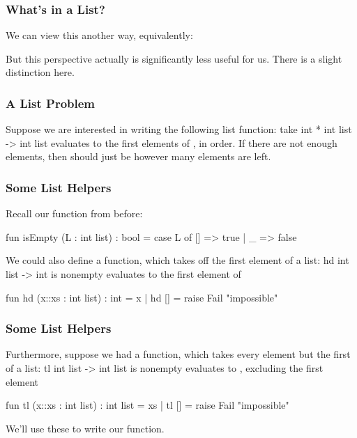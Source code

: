 \documentclass[aspectratio=169]{beamer}
\begin{document}
\begin{frame}[fragile]
  \frametitle{What's in a List?}

  We can view this another way, equivalently: 

  \pause
  \vspace{\fill}


  \pause
  \vspace{\fill}

  But this perspective actually is significantly less useful for
  us. There is a slight distinction here.
\end{frame}

\begin{frame}[fragile]
  \frametitle{A List Problem}

  Suppose we are interested in writing the following list function:
  \spec
    {take}
    {int * int list -> int list}
    {}
    { evaluates to the first  elements of , 
    in order. If there are not enough elements, then  should just be
    however many elements are left.} 

\end{frame}

\begin{frame}[fragile]
  \frametitle{Some List Helpers}

  Recall our  function from before:
  \begin{codeblock}
    fun isEmpty (L : int list) : bool = 
      case L of
        [] => true
      | _ => false 
  \end{codeblock}

  \pause
  \vspace{\fill}

  We could also define a  function, which takes off the
  first element of a list:
  \spec
    {hd}
    {int list -> int}
    { is nonempty}
    { evaluates to the first element of }
  \pause
  \begin{codeblock}
    fun hd (x::xs : int list) : int = x 
      | hd [] = raise Fail "impossible"
  \end{codeblock}

\end{frame}

\begin{frame}[fragile]
  \frametitle{Some List Helpers}

  Furthermore, suppose we had a  function, which takes
  every element but the first of a list: 
  \spec
    {tl}
    {int list -> int list}
    { is nonempty}
    { evaluates to , excluding the first element}
  \pause
  \begin{codeblock}
    fun tl (x::xs : int list) : int list = xs 
      | tl [] = raise Fail "impossible"
  \end{codeblock}

  \pause
  \vspace{\fill}

  We'll use these to write our  function.
\end{frame}
\end{document}

